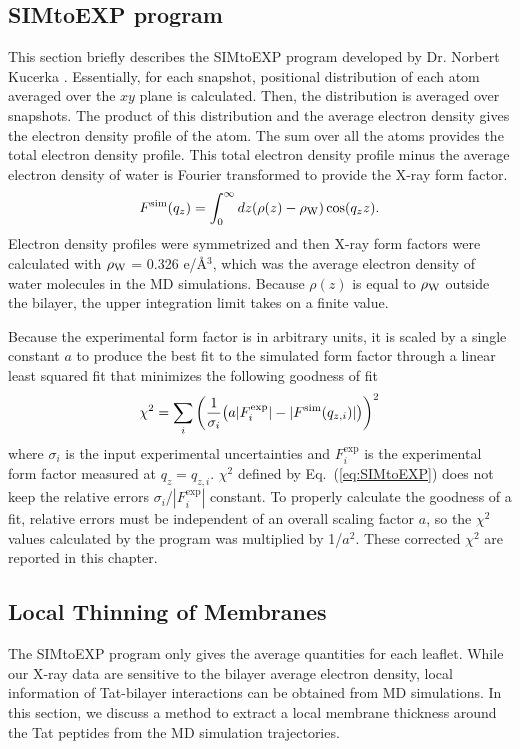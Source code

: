 \subsection{SIMtoEXP program}\label{sec:SIMtoEXP}
This section briefly describes the SIMtoEXP program
developed by Dr. Norbert Kucerka \cite{Kucerka10}.
Essentially, for each snapshot, positional distribution of each atom
averaged over the $xy$ plane is calculated. Then, the distribution is
averaged over snapshots. The product of this distribution and the average
electron density gives the electron density profile of the atom. The sum 
over all the atoms provides the total electron density profile. This total
electron density profile minus the average electron density of water
is Fourier transformed to provide the X-ray form factor.
\begin{equation}
  F^\textrm{sim}(q_z) = \int_0^\infty\mathop{dz} (\rho(z)-\rho_\textrm{W})\cos (q_zz).
\end{equation}
Electron density profiles were symmetrized and then
X-ray form factors were calculated with $\rho_\textrm{W}$ = 0.326 e/\AA$^3$,
which was the average electron density of water molecules in the MD simulations.
Because $\rho(z)$ is equal to $\rho_\textrm{W}$ outside the bilayer, the upper 
integration limit takes on a finite value. 

Because the experimental form factor is in arbitrary units, it is 
scaled by a single constant $a$ to produce the best fit to the simulated
form factor through a linear least squared fit that minimizes the 
following goodness of fit
\begin{equation}
  \chi^2 = \sum_i \left(\frac{1}{\sigma_i}\mathopen{}\left( 
    a|F^\textrm{exp}_i| - |F^\textrm{sim}(q_{z,i})|
   \right)\mathclose{}\right)^2
  \label{eq:SIMtoEXP}
\end{equation}
where $\sigma_i$ is the input experimental uncertainties and $F_i^\textrm{exp}$
is the experimental form factor measured at $q_z = q_{z,i}$.
$\chi^2$ defined by Eq.~(\ref{eq:SIMtoEXP}) does not keep the relative errors
$\sigma_i$/$|F_i^\textrm{exp}|$ constant. 
To properly calculate the goodness of a fit, relative errors must be 
independent of an overall scaling factor $a$, so
the $\chi^2$ values calculated by the program was multiplied by 1/$a^2$. 
These corrected $\chi^2$ are reported in this chapter.

\subsection{Local Thinning of Membranes}\label{sec:local_thinning}
The SIMtoEXP program only gives the average quantities for each leaflet. 
While our X-ray data are sensitive to the bilayer average electron density,
local information of Tat-bilayer interactions can be obtained from MD simulations.
In this section, we discuss a method to extract a local membrane thickness
around the Tat peptides from the MD simulation trajectories. 

